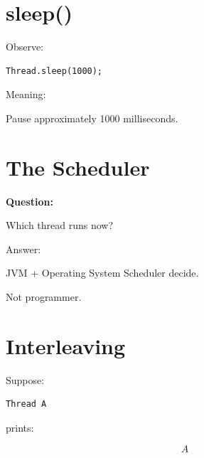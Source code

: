 \documentclass[11pt,a4paper]{book}
\begin{document}

\section{sleep()}

Observe:

\begin{verbatim} 
Thread.sleep(1000);
\end{verbatim}


Meaning:


Pause approximately
1000 milliseconds.


\section{The Scheduler}

\textbf{Question:}


Which thread runs now?


Answer:


JVM + Operating System
Scheduler decide.


Not programmer.


\section{Interleaving}

Suppose:

\begin{verbatim} 
Thread A
\end{verbatim}

prints:

\[
A
\]

\end{document}
